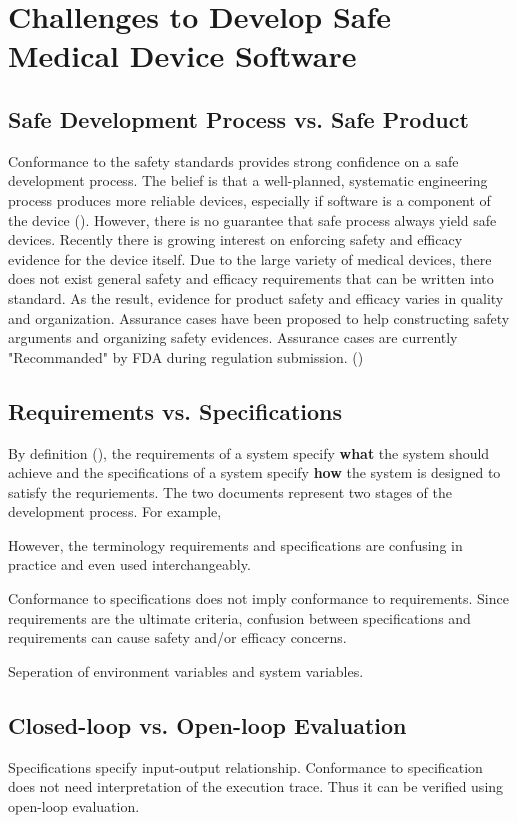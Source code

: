 \section{Challenges to Develop Safe Medical Device Software}
\subsection{Safe Development Process vs. Safe Product}
Conformance to the safety standards provides strong confidence on a safe development process. The belief is that a well-planned, systematic engineering process produces more reliable devices, especially if software is a component of the device (\cite{med-book}). However, there is no guarantee that safe process always yield safe devices. Recently there is growing interest on enforcing safety and efficacy evidence for the device itself. \cite{Wassyng} Due to the large variety of medical devices, there does not exist general safety and efficacy requirements that can be written into standard. As the result, evidence for product safety and efficacy varies in quality and organization. Assurance cases \cite{} have been proposed to help constructing safety arguments and organizing safety evidences. Assurance cases are currently "Recommanded" by FDA during regulation submission. (\cite{})

\subsection{Requirements vs. Specifications}
By definition (\cite{fda3}), the requirements of a system specify \textbf{what} the system should achieve and the specifications of a system specify \textbf{how} the system is designed to satisfy the requriements. The two documents represent two stages of the development process. For example,

However, the terminology requirements and specifications are confusing in practice and even used interchangeably. \cite{reqVSspec} 

Conformance to specifications does not imply conformance to requirements. Since requirements are the ultimate criteria, confusion between specifications and requirements can cause safety and/or efficacy concerns.

Seperation of environment variables and system variables.
\subsection{Closed-loop vs. Open-loop Evaluation}
Specifications specify input-output relationship. Conformance to specification does not need interpretation of the execution trace. Thus it can be verified using open-loop evaluation.

